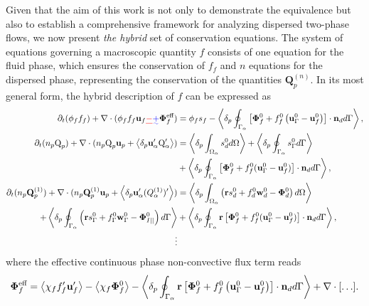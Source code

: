 \documentclass[11pt]{My_preprint}
\providecommand{\DIFadd}[1]{{\protect\color{blue}\uwave{#1}}} %
\providecommand{\DIFdel}[1]{{\protect\color{red}\sout{#1}}}                      %
\providecommand{\DIFaddbegin}{} %
\providecommand{\DIFaddend}{} %
\providecommand{\DIFdelbegin}{} %
\providecommand{\DIFdelend}{} %
\begin{document}
Given that the aim of this work is not only to demonstrate the equivalence but also to establish a comprehensive framework for analyzing dispersed two-phase flows, we now present \textit{the hybrid} set of conservation equations.
The system of equations governing a macroscopic quantity $f$ consists of one equation for the fluid phase, which ensures the conservation of $f_f$ and $n$ equations for the dispersed phase, representing the conservation of the quantities $\textbf{Q}_p^{(n)}$.  
In its most general form, the hybrid description of $f$ can be expressed as
\begin{align}
    \pddt (\phi_f f_f)
    +\div (\phi_f f_f \textbf{u}_f \DIFdelbegin \DIFdel{- }\DIFdelend \DIFaddbegin \DIFadd{+ }\DIFaddend \mathbf{\Phi}_f^\text{eff})
    &= 
    \phi_f s_f
    - \pSavg{\left[
        \mathbf{\Phi}_f^0
        + f_f^0
        \left(
            \textbf{u}_\Gamma^0
            - \textbf{u}_f^0
        \right)
    \right]
    \cdot \textbf{n}_d} ,
    \label{eq:avg_hybrid_dt_chi_f}\\
\pddt (n_p\text Q_p)
        + \div (n_p \text Q_p \textbf{u}_p + \pavg{\textbf{u}_\alpha' \text Q_\alpha'})
        &= \pOavg{ s_d^0 }
        + \pSavg{ s_\Gamma^0 }\nonumber\\
        &+ \pSavg{ \left[\mathbf{\Phi}_f^0 + f_f^0 (\textbf{u}_\Gamma^0-\textbf{u}_f^0) \right] \cdot \textbf{n}_d },
        \label{eq:avg_hybrid_q}
        \\
        \pddt (n_p\textbf{Q}_p^{(1)})
        + \div (n_p \textbf{Q}_p^{(1)} \textbf{u}_p + \pavg{\textbf{u}_\alpha' (Q_\alpha^{(1)})'})
        &=\pOavg{ \left(
            \textbf{r} s_d^0         
            + f_d^0  \textbf{w}_d^0 
            - \mathbf{\Phi}_d^0
        \right) }\nonumber\\
        + \pSavg{ \left(
            \textbf{r}s_\Gamma^0
            + f_\Gamma^0 \textbf{w}_\Gamma^0
            - \mathbf{\Phi}_{I||}^0
        \right) }
        &+ \pSavg{ \textbf{r} \left[
            \mathbf{\Phi}_f^0
            + f_f^0 (\textbf{u}_\Gamma^0-\textbf{u}_f^0)
        \right]\cdot \textbf{n}_d  },
        \label{eq:avg_hybrid_q_1}
        \\\nonumber
        \vdots
\end{align}
where the effective continuous phase non-convective flux term reads 
\begin{align}
    \mathbf{\Phi}_f^\text{eff}
    = \left<\chi_f f_f' \textbf{u}_f'\right>
    - \left<\chi_f \bm\Phi_f^0\right>
    - \left<\delta_p \oint_{\Gamma_{\alpha}} \textbf{r}\left[
        \mathbf{\Phi}_f^0
        + f_f^0
        \left(
            \textbf{u}_\Gamma^0
            - \textbf{u}_f^0
        \right)
    \right]
    \cdot \textbf{n}_d d\Gamma\right>
    + \mathbf{\nabla}\cdot[\ldots].
\end{align}
\end{document}
